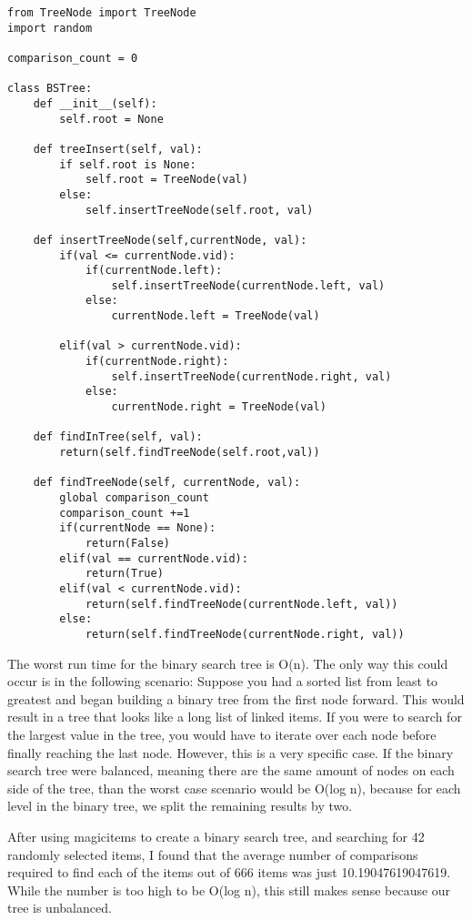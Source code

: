 \documentclass{article}
\begin{document}
\vspace{5mm}
\begin{lstlisting}
from TreeNode import TreeNode
import random

comparison_count = 0

class BSTree:
    def __init__(self):
        self.root = None

    def treeInsert(self, val):
        if self.root is None:
            self.root = TreeNode(val)
        else:
            self.insertTreeNode(self.root, val)

    def insertTreeNode(self,currentNode, val):
        if(val <= currentNode.vid):
            if(currentNode.left):
                self.insertTreeNode(currentNode.left, val)
            else:
                currentNode.left = TreeNode(val)

        elif(val > currentNode.vid):
            if(currentNode.right):
                self.insertTreeNode(currentNode.right, val)
            else:
                currentNode.right = TreeNode(val)

    def findInTree(self, val):
        return(self.findTreeNode(self.root,val))

    def findTreeNode(self, currentNode, val):
        global comparison_count
        comparison_count +=1
        if(currentNode == None):
            return(False)
        elif(val == currentNode.vid):
            return(True)
        elif(val < currentNode.vid):
            return(self.findTreeNode(currentNode.left, val))
        else:
            return(self.findTreeNode(currentNode.right, val))

\end{lstlisting}
\vspace{5mm}
The worst run time for the binary search tree is O(n). The only way this could occur is in the following scenario: Suppose you had a sorted list from least to greatest and began building a binary tree from the first node forward. This would result in a tree that looks like a long list of linked items. If you were to search for the largest value in the tree, you would have to iterate over each node before finally reaching the last node. However, this is a very specific case. If the binary search tree were balanced, meaning there are the same amount of nodes on each side of the tree, than the worst case scenario would be O(log n), because for each level in the binary tree, we split the remaining results by two. 

After using magicitems to create a binary search tree, and searching for 42 randomly selected items, I found that the average number of comparisons required to find each of the items out of 666 items was just 10.19047619047619. While the number is too high to be O(log n), this still makes sense because our tree is unbalanced. 
\end{document}
